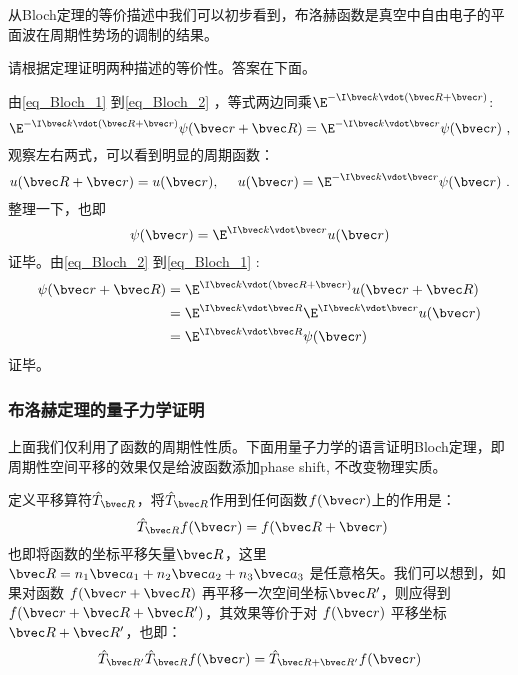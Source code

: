 从Bloch定理的等价描述中我们可以初步看到，布洛赫函数是真空中自由电子的平面波在周期性势场的调制的结果。

\begin{exercise}{}
请根据定理证明两种描述的等价性。答案在下面。
\end{exercise}
由\autoref{eq_Bloch_1} 到\autoref{eq_Bloch_2} ，等式两边同乘$\E^{-\I \bvec k \vdot (\bvec R + \bvec r)}$:
\begin{equation}
\E^{-\I \bvec k \vdot (\bvec R + \bvec r)}\psi(\bvec r + \bvec R) = \E^{-\I \bvec k \vdot \bvec r}\psi(\bvec r)~,
\end{equation}
观察左右两式，可以看到明显的周期函数：
\begin{equation}
u(\bvec R + \bvec r) = u(\bvec r),~\quad u(\bvec r) = \E^{-\I \bvec k \vdot \bvec r}\psi(\bvec r)~.
\end{equation}
整理一下，也即
\begin{equation}
\psi(\bvec r) = \E^{\I \bvec k \vdot \bvec r} u(\bvec r)
\end{equation}
证毕。由\autoref{eq_Bloch_2} 到\autoref{eq_Bloch_1} :
\begin{align}
\psi(\bvec r + \bvec R) &= \E^{\I \bvec k \vdot (\bvec R + \bvec r)} u(\bvec r + \bvec R)\\
&= \E^{\I \bvec k \vdot \bvec R } \E^{\I \bvec k \vdot  \bvec r}u(\bvec r )\\ &= \E^{\I \bvec k \vdot \bvec R } \psi(\bvec r)
\end{align}
证毕。

\subsubsection{布洛赫定理的量子力学证明}
上面我们仅利用了函数的周期性性质。下面用量子力学的语言证明Bloch定理，即周期性空间平移的效果仅是给波函数添加phase shift, 不改变物理实质。

定义平移算符$\hat{T}_{\bvec R}$，将$\hat{T}_{\bvec R}$作用到任何函数$f(\bvec r)$上的作用是：
\begin{equation}\
\hat{T}_{\bvec R} f(\bvec r) = f(\bvec R + \bvec r)
\end{equation}
也即将函数的坐标平移矢量$\bvec R$，这里$\bvec R = n_1 \bvec a_1 + n_2 \bvec a_2 + n_3 \bvec a_3 $ 是任意格矢。我们可以想到，如果对函数 $f(\bvec r + \bvec R)$ 再平移一次空间坐标$\bvec R'$，则应得到$f(\bvec r + \bvec R + \bvec R')$，其效果等价于对 $f(\bvec r)$ 平移坐标$\bvec R + \bvec R'$，也即：
\begin{equation}
\hat{T}_{\bvec R'}\hat{T}_{\bvec R} f(\bvec r) = \hat{T}_{\bvec R + \bvec R'}f(\bvec r )
\end{equation}

